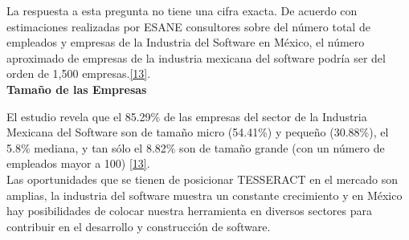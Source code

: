La respuesta a esta pregunta no tiene una cifra exacta. De acuerdo con estimaciones realizadas por ESANE consultores sobre del número total de empleados y empresas de la Industria del Software en México, el número aproximado de empresas de la industria mexicana del software podría ser del orden de 1,500 empresas.\hyperlink{b13}{[13]}.\\
 
\textbf{Tamaño de las Empresas}

El estudio revela que el 85.29\% de las empresas del sector de la Industria Mexicana del Software son de tamaño micro (54.41\%) y pequeño (30.88\%), el 5.8\% mediana, y tan sólo el 8.82\% son de tamaño grande (con un número de empleados mayor a 100) \hyperlink{b13}{[13]}.\\

Las oportunidades que se tienen de posicionar TESSERACT en el mercado son amplias, la industria del software muestra un constante crecimiento y en México hay posibilidades de colocar nuestra herramienta en diversos sectores para contribuir en el desarrollo y construcción de software. 